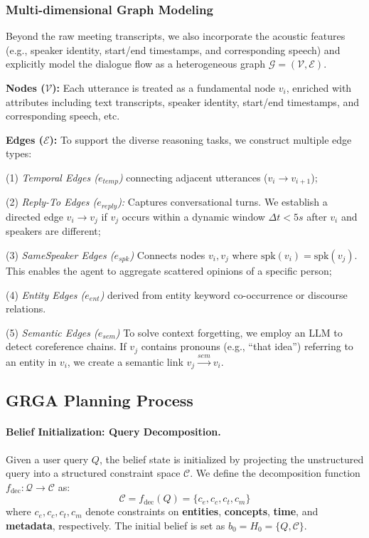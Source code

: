 \documentclass[11pt]{article}
\begin{document}
\subsubsection{Multi-dimensional Graph Modeling}

Beyond the raw meeting transcripts, we also incorporate the acoustic features (e.g., speaker identity, start/end timestamps, and corresponding speech) and explicitly model the dialogue flow as a heterogeneous graph  $\mathcal{G} = (\mathcal{V}, \mathcal{E}) $. 

\textbf{Nodes ($ \mathcal{V} $):} Each utterance is treated as a fundamental node $ v_i $, enriched with attributes including text transcripts, speaker identity, start/end timestamps, and corresponding speech, etc.

\textbf{Edges ($ \mathcal{E} $):} To support the diverse reasoning tasks, we construct multiple edge types: 

(1) \textit{Temporal Edges ($e_{temp}$)} connecting adjacent utterances ($ v_i \rightarrow v_{i+1} $); 

(2) \textit{Reply-To Edges ($e_{reply}$):} Captures conversational turns. We establish a directed edge $v_i \rightarrow v_j$ if $v_j$ occurs within a dynamic window $\Delta t < 5s$ after $v_i$ and speakers are different; 

(3) \textit{SameSpeaker Edges ($e_{spk}$)} Connects nodes $v_i, v_j$ where $\text{spk}(v_i) = \text{spk}(v_j)$. This enables the agent to aggregate scattered opinions of a specific person;

(4) \textit{Entity Edges ($e_{ent}$)} derived from entity keyword co-occurrence or discourse relations.

(5) \textit{Semantic Edges ($e_{sem}$)} To solve context forgetting, we employ an LLM to detect coreference chains. If $v_j$ contains pronouns (e.g., ``that idea'') referring to an entity in $v_i$, we create a semantic link $v_j \xrightarrow{sem} v_i$.


\subsection{GRGA Planning Process}

\paragraph{Belief Initialization: Query Decomposition.}

Given a user query $Q$, the belief state is initialized by projecting the unstructured query into a structured constraint space $\mathcal{C}$. We define the decomposition function $f_{\text{dec}}: \mathcal{Q} \to \mathcal{C}$ as:
\begin{equation}
    \mathcal{C} = f_{\text{dec}}(Q) = \{ c_e, c_c, c_t, c_m \}
\end{equation}
where $c_e, c_c, c_t, c_m$ denote constraints on \textbf{entities}, \textbf{concepts}, \textbf{time}, and \textbf{metadata}, respectively. The initial belief is set as $b_0 = H_0 = \{Q, \mathcal{C}\}$.
\end{document}
